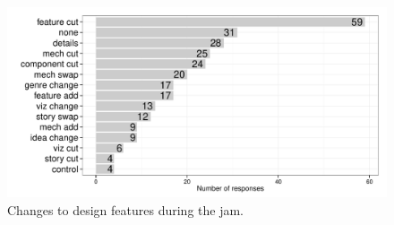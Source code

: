 \documentclass{sig-alternate}
\begin{document}

\begin{figure}
\centering
\includegraphics[width=\linewidth]{./idea_change}
\caption{Changes to design features during the jam.}
\label{fig:idea_changes}
\end{figure}
\end{document}
